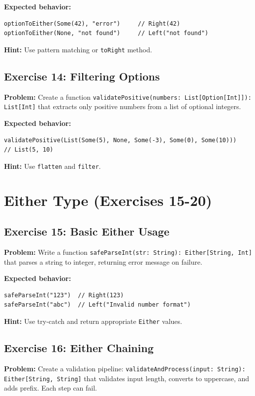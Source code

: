 \documentclass[12pt,a4paper]{article}
\begin{document}
\textbf{Expected behavior:}
\begin{lstlisting}
optionToEither(Some(42), "error")     // Right(42)
optionToEither(None, "not found")     // Left("not found")
\end{lstlisting}

\textbf{Hint:} Use pattern matching or \texttt{toRight} method.

\subsection{Exercise 14: Filtering Options}
\textbf{Problem:} Create a function \texttt{validatePositive(numbers: List[Option[Int]]): List[Int]} that extracts only positive numbers from a list of optional integers.

\textbf{Expected behavior:}
\begin{lstlisting}
validatePositive(List(Some(5), None, Some(-3), Some(0), Some(10)))
// List(5, 10)
\end{lstlisting}

\textbf{Hint:} Use \texttt{flatten} and \texttt{filter}.

\section{Either Type (Exercises 15-20)}

\subsection{Exercise 15: Basic Either Usage}
\textbf{Problem:} Write a function \texttt{safeParseInt(str: String): Either[String, Int]} that parses a string to integer, returning error message on failure.

\textbf{Expected behavior:}
\begin{lstlisting}
safeParseInt("123")  // Right(123)
safeParseInt("abc")  // Left("Invalid number format")
\end{lstlisting}

\textbf{Hint:} Use try-catch and return appropriate \texttt{Either} values.

\subsection{Exercise 16: Either Chaining}
\textbf{Problem:} Create a validation pipeline: \texttt{validateAndProcess(input: String): Either[String, String]} that validates input length, converts to uppercase, and adds prefix. Each step can fail.
\end{document}
